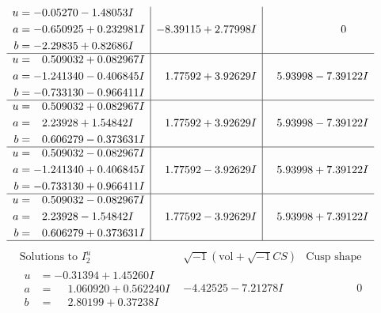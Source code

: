 \documentclass[1p]{elsarticle_modified}
\theoremstyle{definition}
\newcommand{\I}{\sqrt{-1}}
\begin{document}
$$\begin{array}{c|c|c}
\begin{aligned}
u &= -0.05270 - 1.48053 I \\
a &= -0.650925 + 0.232981 I \\
b &= -2.29835 + 0.82686 I\end{aligned}
 & -8.39115 + 2.77998 I & \phantom{-0.000000 } 0 \\ \hline\begin{aligned}
u &= \phantom{-}0.509032 + 0.082967 I \\
a &= -1.241340 - 0.406845 I \\
b &= -0.733130 - 0.966411 I\end{aligned}
 & \phantom{-}1.77592 + 3.92629 I & \phantom{-}5.93998 - 7.39122 I \\ \hline\begin{aligned}
u &= \phantom{-}0.509032 + 0.082967 I \\
a &= \phantom{-}2.23928 + 1.54842 I \\
b &= \phantom{-}0.606279 - 0.373631 I\end{aligned}
 & \phantom{-}1.77592 + 3.92629 I & \phantom{-}5.93998 - 7.39122 I \\ \hline\begin{aligned}
u &= \phantom{-}0.509032 - 0.082967 I \\
a &= -1.241340 + 0.406845 I \\
b &= -0.733130 + 0.966411 I\end{aligned}
 & \phantom{-}1.77592 - 3.92629 I & \phantom{-}5.93998 + 7.39122 I \\ \hline\begin{aligned}
u &= \phantom{-}0.509032 - 0.082967 I \\
a &= \phantom{-}2.23928 - 1.54842 I \\
b &= \phantom{-}0.606279 + 0.373631 I\end{aligned}
 & \phantom{-}1.77592 - 3.92629 I & \phantom{-}5.93998 + 7.39122 I\\
 \hline 
 \end{array}$$\newpage$$\begin{array}{c|c|c}  
\text{Solutions to }I^u_{2}& \I (\text{vol} + \sqrt{-1}CS) & \text{Cusp shape}\\
 \hline 
\begin{aligned}
u &= -0.31394 + 1.45260 I \\
a &= \phantom{-}1.060920 + 0.562240 I \\
b &= \phantom{-}2.80199 + 0.37238 I\end{aligned}
 & -4.42525 - 7.21278 I & \phantom{-0.000000 } 0 \\ \hline\begin{aligned}

\end{aligned}
\end{array}$$
\end{document}
